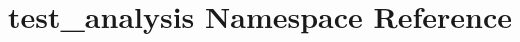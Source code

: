 \hypertarget{namespacetest__analysis}{\section{test\-\_\-analysis Namespace Reference}
\label{namespacetest__analysis}
}

